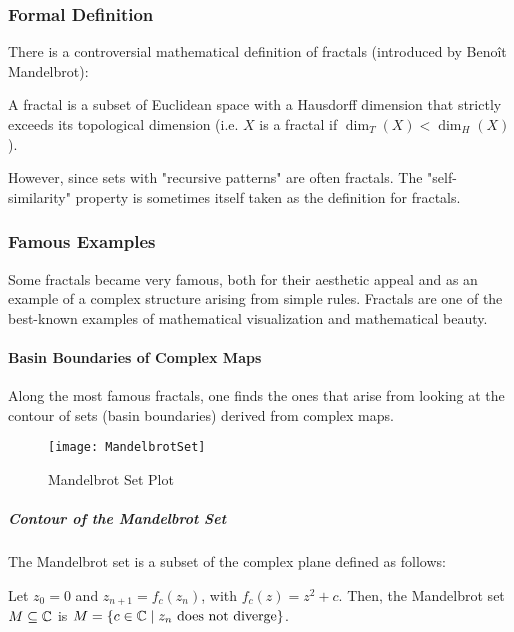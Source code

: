 \subsubsection{Formal Definition}
There is a controversial mathematical definition of fractals (introduced by Benoît Mandelbrot):
\begin{definition}[Fractal]\label{def:fractal}
	A fractal is a subset of Euclidean space with a Hausdorff dimension that strictly exceeds its topological dimension (i.e. $X$ is a fractal if $\dim_T(X) < \dim_H(X)$).
\end{definition}
However, since sets with "recursive patterns" are often fractals.
The "self-similarity" property is sometimes itself taken as the definition for fractals.

\subsubsection{Famous Examples}\label{fractalsExamples}
Some fractals became very famous, both for their aesthetic appeal and as an example of a complex structure arising from simple rules.
Fractals are one of the best-known examples of mathematical visualization and mathematical beauty.

\paragraph{Basin Boundaries of Complex Maps}
Along the most famous fractals, one finds the ones that arise from looking at the contour of sets (basin boundaries) derived from complex maps.

\begin{wrapfigure}{r}{7.25cm}
	\centering
	\texttt{[image: MandelbrotSet]}
	\caption[Mandelbrot Set Plot]{Mandelbrot Set Plot\footnotemark}
	\label{fig:MandelbrotSet}
	\vspace{-0.75cm}
\end{wrapfigure}
\addtocounter{footnote}{-1}
\subparagraph{Contour of the Mandelbrot Set}
The Mandelbrot set is a subset of the complex plane defined as follows:
\begin{definition}\label{def:MandelbrotSet}
	Let $z_0 = 0$ and $z_{n+1} = f_c(z_n)$, with $f_c(z) = z^2+c$.
	Then, the Mandelbrot set $M \subseteq \mathbb{C}$ is $M = \left\lbrace c \in \mathbb{C} \mid z_n \text{ does not diverge} \right\rbrace$.
\end{definition}

